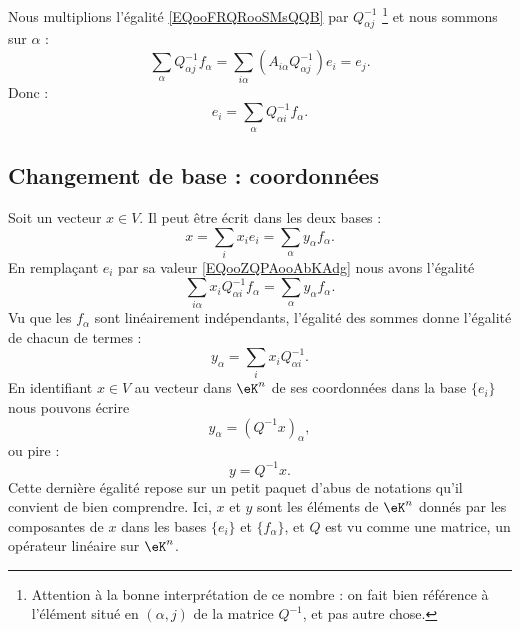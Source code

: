Nous multiplions l'égalité \eqref{EQooFRQRooSMsQQB} par \( Q^{-1}_{\alpha j}\) \footnote{Attention à la bonne interprétation de ce nombre : on fait bien référence à l'élément situé en \( (\alpha, j) \) de la matrice \( Q^{-1} \), et pas autre chose.} et nous sommons sur \( \alpha\) :
\begin{equation}
    \sum_{\alpha}Q^{-1}_{\alpha j}f_{\alpha}=\sum_{i\alpha}(A_{i\alpha}Q^{-1}_{\alpha j})e_i=e_j.
\end{equation}
Donc :
\begin{equation}    \label{EQooZQPAooAbKAdg}
    e_i=\sum_{\alpha}Q^{-1}_{\alpha i}f_{\alpha}.
\end{equation}

\subsection{Changement de base : coordonnées}

Soit un vecteur \( x\in V\). Il peut être écrit dans les deux bases :
\begin{equation}
    x=\sum_ix_ie_i=\sum_{\alpha}y_{\alpha}f_{\alpha}.
\end{equation}
En remplaçant \( e_i\) par sa valeur \eqref{EQooZQPAooAbKAdg} nous avons l'égalité
\begin{equation}
    \sum_{i\alpha}x_iQ^{-1}_{\alpha i}f_{\alpha}=\sum_{\alpha}y_{\alpha}f_{\alpha}.
\end{equation}
Vu que les \( f_{\alpha}\) sont linéairement indépendants, l'égalité des sommes donne l'égalité de chacun de termes :
\begin{equation}        \label{EQooFXYLooCRmRdA}
    y_{\alpha}=\sum_ix_iQ^{-1}_{\alpha i}.
\end{equation}
En identifiant \( x\in V\) au vecteur dans \( \eK^n\) de ses coordonnées dans la base \( \{ e_i \}\) nous pouvons écrire
\begin{equation}
    y_{\alpha}=(Q^{-1}x)_{\alpha},
\end{equation}
ou pire :
\begin{equation}
    y=Q^{-1}x.
\end{equation}
Cette dernière égalité repose sur un petit paquet d'abus de notations qu'il convient de bien comprendre. Ici, \( x\) et \( y\) sont les éléments de \( \eK^n\) donnés par les composantes de \( x\) dans les bases \( \{ e_i \}\) et \( \{ f_{\alpha} \}\), et \( Q\) est vu comme une matrice, un opérateur linéaire sur \( \eK^n\).

